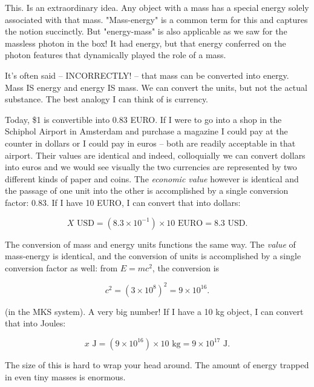\documentclass[
]{article}
\begin{document}
This. Is an extraordinary idea. Any object with a mass has a special
energy solely associated with that mass. "Mass-energy" is a common term
for this and captures the notion succinctly. But "energy-mass" is also
applicable as we saw for the massless photon in the box! It had energy,
but that energy conferred on the photon features that dynamically played
the role of a mass.

It's often said -- INCORRECTLY! -- that mass can be converted into
energy. Mass IS energy and energy IS mass. We can convert the units, but
not the actual substance. The best analogy I can think of is currency.

Today, \$1 is convertible into 0.83 EURO. If I were to go into a shop in
the Schiphol Airport in Amsterdam and purchase a magazine I could pay at
the counter in dollars or I could pay in euros -- both are readily
acceptable in that airport. Their values are identical and indeed,
colloquially we can convert dollars into euros and we would see visually
the two currencies are represented by two different kinds of paper and
coins. The \emph{economic value} however is identical and the passage of
one unit into the other is accomplished by a single conversion factor:
0.83. If I have 10 EURO, I can convert that into dollars:

\[X \text{ USD} = (8.3 \times 10^{-1}) \times 10 \text{ EURO}= 8.3 \text{ USD.}\nonumber\]

The conversion of mass and energy units functions the same way. The
\emph{value} of mass-energy is identical, and the conversion of units is
accomplished by a single conversion factor as well: from \(E=mc^2\), the
conversion is

\[c^2 = (3 \times 10^8)^2=9 \times 10^{16}. \nonumber\]

(in the MKS system). A very big number! If I have a 10 kg object, I can
convert that into Joules:

\[x \text{ J} = (9 \times 10^{16})\times 10 \text{ kg} = 9 \times 10^{17} \text{ J.} \nonumber\]

The size of this is hard to wrap your head around. The amount of energy
trapped in even tiny masses is enormous.
\end{document}
